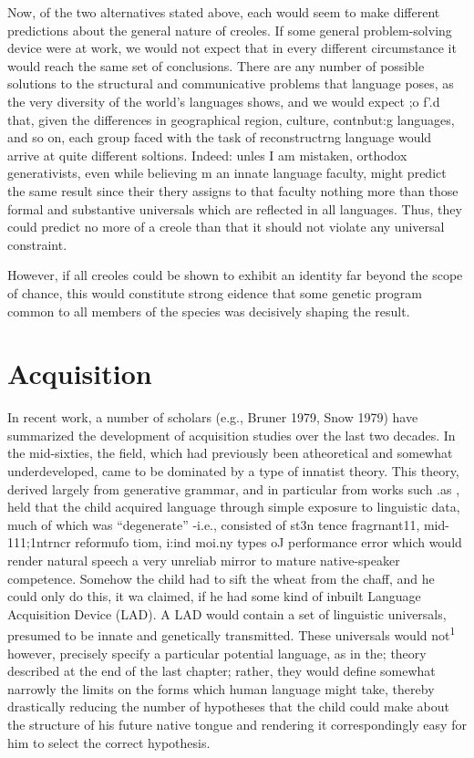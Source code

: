 Now, of the two alternatives stated above, each would seem to make different predictions about the general nature of creoles. If some general problem-solving device were at work, we would not expect that in every different circumstance it would reach the same set of conclusions. There are any number of possible solutions to the struc\-tural and communicative problems that language poses, as the very diversity of the world's languages shows, and we would expect ;o f'.{\textquotedbl}d that, given the differences in geographical region, culture, contnbut:{\textquotedbl}g languages, and so on, each group faced with the task of reconstructrng language would arrive at quite different soltions. Indeed: unles I am mistaken, orthodox generativists, even while believing m an innate language faculty, might predict the same result since their thery assigns to that faculty nothing more than those formal and substantive universals which are reflected in all languages. Thus, they could pre\-dict no more of a creole than that it should not violate any universal constraint.

However, if all creoles could be shown to exhibit an identity far beyond the scope of chance, this would constitute strong eidence that some genetic program common to all members of the species was decisively shaping the result.




\chapter{Acquisition}

In recent work, a number of scholars (e.g., Bruner 1979, Snow 1979) have summarized the development of acquisition studies over the last two decades. In the mid-sixties, the field, which had previously been atheoretical and somewhat underdeveloped, came to be domi\-nated by a type of innatist theory. This theory, derived largely from generative grammar, and in particular from works such .as \citet{Chomsky1962}, held that the child acquired language through simple exposure to linguistic data, much of which was ``degenerate'' {}-i.e., consisted of st3n tence fragrnant11, mid-111;1ntrncr reformufo tiom, i:ind moi.ny types oJ performance error which would render natural speech a very unreliab mirror to mature native-speaker competence. Somehow the child had to sift the wheat from the chaff, and he could only do this, it wa claimed, if he had some kind of inbuilt Language Acquisition Device (LAD). A LAD would contain a set of linguistic universals, presumed to be innate and genetically transmitted. These universals would not\textsuperscript{1} however, precisely specify a particular potential language, as in the; theory described at the end of the last chapter; rather, they would de\-fine somewhat narrowly the limits on the forms which human language might take, thereby drastically reducing the number of hypotheses
that the child could make about the structure of his future native tongue and rendering it correspondingly easy for him to select the correct hypothesis.

